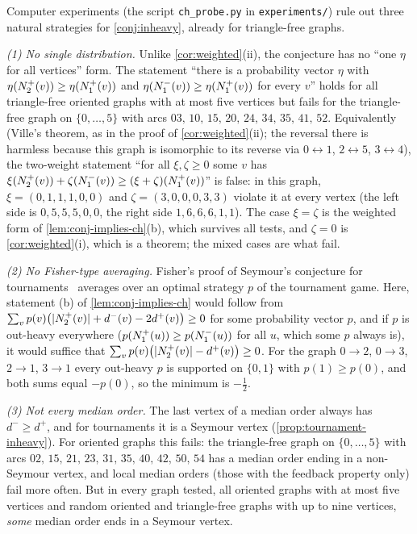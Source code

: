 \begin{remark}\label{rem:ch-barriers}
Computer experiments (the script \texttt{ch\_probe.py} in \texttt{experiments/})
rule out three natural strategies for \cref{conj:inheavy}, already for triangle-free
graphs.

\emph{(1) No single distribution.} Unlike \cref{cor:weighted}(ii), the conjecture has no
``one $\eta$ for all vertices'' form. The statement ``there is a probability vector
$\eta$ with $\eta(N^+_2(v))\ge\eta(N^+_1(v))$ and $\eta(N^-_1(v))\ge\eta(N^+_1(v))$ for
every $v$'' holds for all triangle-free oriented graphs with at most five vertices but
fails for the triangle-free graph on $\{0,\dots,5\}$ with arcs
$03,\,10,\,15,\,20,\,24,\,34,\,35,\,41,\,52$. Equivalently (Ville's theorem, as in the
proof of \cref{cor:weighted}(ii); the reversal there is harmless because this graph is
isomorphic to its reverse via $0\leftrightarrow1$, $2\leftrightarrow5$,
$3\leftrightarrow4$), the two-weight statement ``for all $\xi,\zeta\ge0$
some $v$ has $\xi(N^+_2(v))+\zeta(N^-_1(v))\ge(\xi+\zeta)(N^+_1(v))$'' is false: in this
graph, $\xi=(0,1,1,1,0,0)$ and $\zeta=(3,0,0,0,3,3)$ violate it at every vertex (the
left side is $0,5,5,5,0,0$, the right side $1,6,6,6,1,1$). The case $\xi=\zeta$ is the
weighted form of \cref{lem:conj-implies-ch}(b), which survives all tests, and
$\zeta=0$ is \cref{cor:weighted}(i), which is a theorem; the mixed cases are what fail.

\emph{(2) No Fisher-type averaging.} Fisher's proof of Seymour's conjecture for
tournaments~\cite{Fisher1996} averages over an optimal strategy $p$ of the tournament
game. Here, statement (b) of \cref{lem:conj-implies-ch} would follow from
$\sum_vp(v)\bigl(\lvert N^+_2(v)\rvert+d^-(v)-2d^+(v)\bigr)\ge0$ for some probability vector $p$,
and if $p$ is out-heavy everywhere ($p(N^+_1(u))\ge p(N^-_1(u))$ for all $u$, which some
$p$ always is), it would suffice that $\sum_vp(v)\bigl(\lvert N^+_2(v)\rvert-d^+(v)\bigr)\ge0$. For
the graph $0\to2$, $0\to3$, $2\to1$, $3\to1$ every out-heavy $p$ is supported on
$\{0,1\}$ with $p(1)\ge p(0)$, and both sums equal $-p(0)$, so the minimum is $-\tfrac12$.

\emph{(3) Not every median order.} The last vertex of a median order always has
$d^-\ge d^+$, and for tournaments it is a Seymour vertex
(\cref{prop:tournament-inheavy}). For oriented graphs this fails: the triangle-free
graph on $\{0,\dots,5\}$ with arcs $02,\,15,\,21,\,23,\,31,\,35,\,40,\,42,\,50,\,54$ has a
median order ending in a non-Seymour vertex, and local median orders (those with the
feedback property only) fail more often. But in every graph tested, all oriented graphs
with at most five vertices and random oriented and triangle-free graphs with up to
nine vertices, \emph{some} median order ends in a Seymour vertex.
\end{remark}

